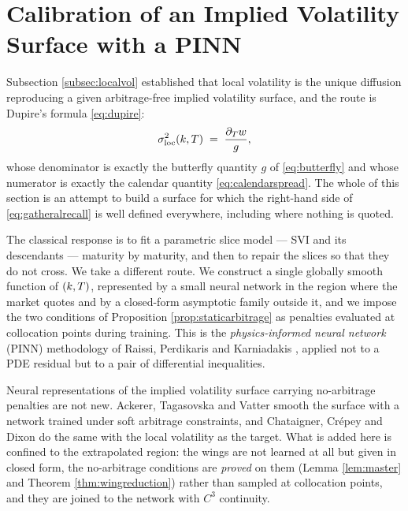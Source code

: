 \vspace{-0.5cm}

\section{Calibration of an Implied Volatility Surface with a PINN}
\label{sec:pinn}

\vspace{-0.5cm}

Subsection \ref{subsec:localvol} established that local volatility is the unique diffusion
reproducing a given arbitrage-free implied volatility surface, and the route is Dupire's
formula \eqref{eq:dupire}:
\begin{equation}\label{eq:gatheralrecall}
  \sigma_{\mathrm{loc}}^{2}(k,T) \;=\; \frac{\partial_{T}w}{g},
\end{equation}
whose denominator is exactly the butterfly quantity $g$ of \eqref{eq:butterfly} and whose numerator
is exactly the calendar quantity \eqref{eq:calendarspread}. The whole of this section is an attempt
to build a surface for which the right-hand side of \eqref{eq:gatheralrecall} is well defined
everywhere, including where nothing is quoted.

The classical response is to fit a parametric slice model --- SVI \cite{gatheral2014} and its
descendants --- maturity by maturity, and then to repair the slices so that they do not cross. We
take a different route. We construct a single globally smooth function of $(k,T)$, represented by
a small neural network in the region where the market quotes and by a closed-form asymptotic family
outside it, and we impose the two conditions of Proposition \ref{prop:staticarbitrage} as penalties
evaluated at collocation points during training. This is the \emph{physics-informed neural network}
(PINN) methodology of Raissi, Perdikaris and Karniadakis \cite{raissi2019}, applied not to a PDE
residual but to a pair of differential inequalities.

Neural representations of the implied volatility surface carrying no-arbitrage penalties are not
new. Ackerer, Tagasovska and Vatter \cite{ackerer2020} smooth the surface with a network trained
under soft arbitrage constraints, and Chataigner, Cr\'epey and Dixon \cite{chataigner2020} do the
same with the local volatility as the target. What is added here is confined to the extrapolated
region: the wings are not learned at all but given in closed form, the no-arbitrage conditions are
\emph{proved} on them (Lemma \ref{lem:master} and Theorem \ref{thm:wingreduction}) rather than
sampled at collocation points, and they are joined to the network with $C^{3}$ continuity.

